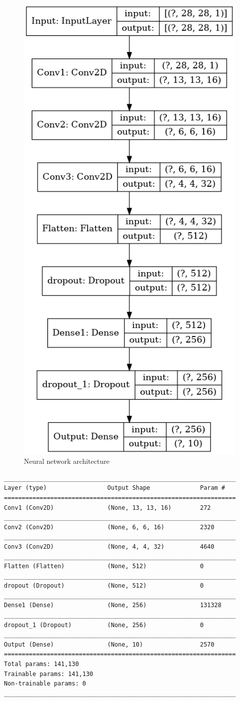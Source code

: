 \documentclass[12pt,a4paper]{scrartcl}
\begin{document}
	\begin{figure}[H]
		\centering
		\includegraphics[width=0.3\linewidth]{figs/ex4_2_model.png}
		\caption{Neural network architecture}
		\label{fig:ex4_2_network}
	\end{figure}
	
		\begin{lstlisting}
_________________________________________________________________
Layer (type)                 Output Shape              Param #   
=================================================================
Conv1 (Conv2D)               (None, 13, 13, 16)        272       
_________________________________________________________________
Conv2 (Conv2D)               (None, 6, 6, 16)          2320      
_________________________________________________________________
Conv3 (Conv2D)               (None, 4, 4, 32)          4640      
_________________________________________________________________
Flatten (Flatten)            (None, 512)               0         
_________________________________________________________________
dropout (Dropout)            (None, 512)               0         
_________________________________________________________________
Dense1 (Dense)               (None, 256)               131328    
_________________________________________________________________
dropout_1 (Dropout)          (None, 256)               0         
_________________________________________________________________
Output (Dense)               (None, 10)                2570      
=================================================================
Total params: 141,130
Trainable params: 141,130
Non-trainable params: 0
_________________________________________________________________
	\end{lstlisting}
	
\end{document}
